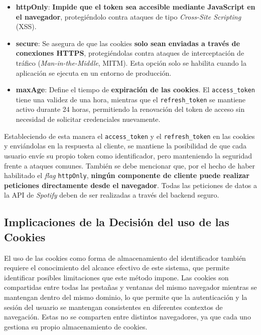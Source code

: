 \setlength{\itemsep}{0pt}
\begin{itemize}
    \item \textbf{httpOnly}: \textbf{Impide que el token sea accesible mediante JavaScript en el navegador}, protegiéndolo contra ataques de tipo \textit{Cross-Site Scripting} (XSS).
    \item \textbf{secure}: Se asegura de que las cookies \textbf{solo sean enviadas a través de conexiones HTTPS}, protegiéndolas contra ataques de interceptación de tráfico (\textit{Man-in-the-Middle}, MITM). Esta opción solo se habilita cuando la aplicación se ejecuta en un entorno de producción.
    \item \textbf{maxAge}: Define el tiempo de \textbf{expiración de las cookies}. El \texttt{access\_token} tiene una validez de una hora, mientras que el \texttt{refresh\_token} se mantiene activo durante 24 horas, permitiendo la renovación del token de acceso sin necesidad de solicitar credenciales nuevamente.
\end{itemize}

Estableciendo de esta manera el \texttt{access\_token} y el \texttt{refresh\_token} en las cookies y enviándolas en la respuesta al cliente, se mantiene la posibilidad de que cada usuario envíe su propio token como identificador, pero manteniendo la seguridad frente a ataques comunes. También se debe mencionar que, por el hecho de haber habilitado el \textit{flag} \texttt{httpOnly}, \textbf{ningún componente de cliente puede realizar peticiones directamente desde el navegador}. Todas las peticiones de datos a la API de \textit{Spotify} deben de ser realizadas a través del backend seguro.

\subsection*{Implicaciones de la Decisión del uso de las Cookies}

El uso de las cookies como forma de almacenamiento del identificador también requiere el conocimiento del alcance efectivo de este sistema, que permite identificar posibles limitaciones que este método impone. Las cookies son compartidas entre todas las pestañas y ventanas del mismo navegador mientras se mantengan dentro del mismo dominio, lo que permite que la autenticación y la sesión del usuario se mantengan consistentes en diferentes contextos de navegación. Estas no se comparten entre distintos navegadores, ya que cada uno gestiona su propio almacenamiento de cookies.

